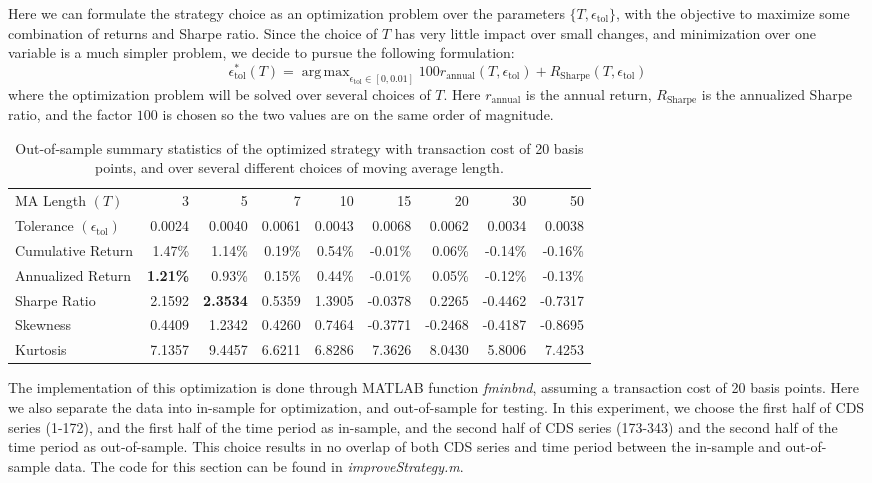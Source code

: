 \documentclass[11pt]{article}
\theoremstyle{definition}
\DeclareMathOperator*{\argmax}{arg\,max}
\begin{document}
Here we can formulate the strategy choice as 
an optimization problem over 
the parameters $\{T, \epsilon_\text{tol}\}$,
with the objective to maximize some combination 
of returns and Sharpe ratio.
Since the choice of $T$ has very little impact 
over small changes, and minimization over 
one variable is a much simpler problem,
we decide to pursue the following formulation:
%
\begin{equation} \label{eq:optimization}
  \epsilon_\text{tol}^*(T) = 
  \argmax_{\epsilon_\text{tol} \in [0, 0.01]}
    100 r_\text{annual}(T,\epsilon_\text{tol}) + 
    R_\text{Sharpe}(T,\epsilon_\text{tol})
\end{equation}
%
where the optimization problem will be solved 
over several choices of $T$.
Here $r_\text{annual}$ is the annual return,
$R_\text{Sharpe}$ is the annualized Sharpe ratio,
and the factor $100$ is chosen so the two values 
are on the same order of magnitude.

\begin{table}[h!]
\centering
\begin{tabular}{ | l | r | r | r | r | r | r | r | r | }
  \hline      
  MA Length $(T)$ & 3 & 5 & 7 & 10 & 15 & 20 & 30 & 50 \\
  Tolerance $(\epsilon_\text{tol})$ &
    0.0024 & 0.0040 & 0.0061 & 0.0043 & 0.0068 & 0.0062 & 0.0034 & 0.0038 \\
  \hline
  Cumulative Return & 
    1.47\% & 1.14\% & 0.19\% & 0.54\% & -0.01\% & 0.06\% & -0.14\% & -0.16\% \\
  Annualized Return & 
    \textbf{1.21\%} & 0.93\% & 0.15\% & 0.44\% & -0.01\% & 0.05\% & 
    -0.12\% & -0.13\% \\
  Sharpe Ratio & 
    2.1592 & \textbf{2.3534} & 0.5359 & 1.3905 & -0.0378 & 0.2265 & 
    -0.4462 & -0.7317 \\
  Skewness & 
    0.4409 & 1.2342 & 0.4260 & 0.7464 & -0.3771 & -0.2468 & -0.4187 & -0.8695 \\
  Kurtosis & 
    7.1357 & 9.4457 & 6.6211 & 6.8286 & 7.3626 & 8.0430 & 5.8006 & 7.4253 \\
  \hline  
\end{tabular}
\caption{Out-of-sample summary statistics of the optimized strategy
  with transaction cost of 20 basis points,
  and over several different choices of moving average length.}
\label{tab:opt_summary}
\end{table}

The implementation of this optimization is done 
through MATLAB function \emph{fminbnd},
assuming a transaction cost of 20 basis points.
Here we also separate the data into 
in-sample for optimization,
and out-of-sample for testing.
In this experiment, we choose the first half of 
CDS series (1-172),
and the first half of the time period as in-sample,
and the second half of CDS series (173-343)
and the second half of the time period as out-of-sample.
This choice results in no overlap of both 
CDS series and time period between 
the in-sample and out-of-sample data.
The code for this section can be found in \emph{improveStrategy.m}.
\end{document}
